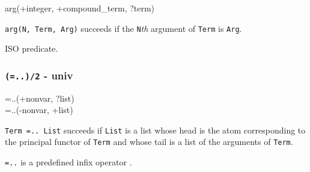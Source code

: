 \begin{TemplatesOneCol}
arg(+integer, +compound\_term, ?term)

\end{TemplatesOneCol}

\Description

\texttt{arg(N, Term, Arg)} succeeds if the \texttt{N}\emph{th} argument of
\texttt{Term} is \texttt{Arg}.

\begin{PlErrors}






\end{PlErrors}

\Portability

ISO predicate.

\subsubsection{\texttt{(=..)/2} - univ}
\label{(=..)/2}

\begin{TemplatesOneCol}
=..(+nonvar, ?list)\\
=..(-nonvar, +list)

\end{TemplatesOneCol}

\Description

\texttt{Term =.. List} succeeds if \texttt{List} is a list whose head is the
atom corresponding to the principal functor of \texttt{Term} and whose tail
is a list of the arguments of \texttt{Term}.

\texttt{=..} is a predefined infix operator .

